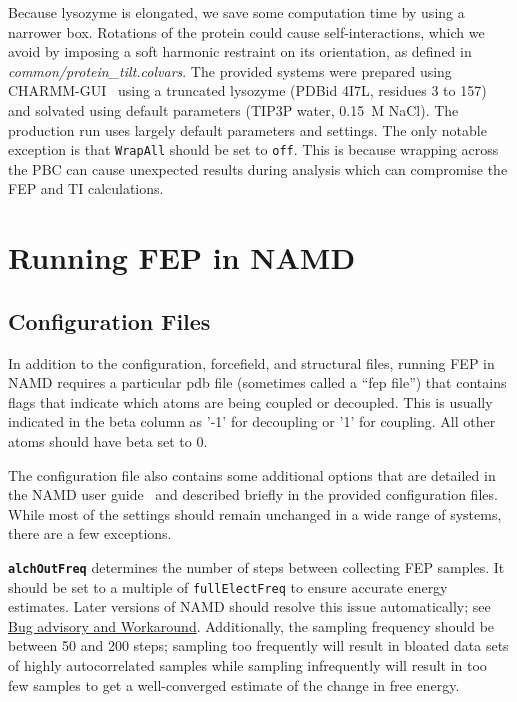 \documentclass[9pt,tutorial]{Styling/livecoms}
\newcommand{\filepath}[1]{\textit{#1}}
\newcommand{\textInput}[1]{\texttt{#1}}
\begin{document}
Because lysozyme is elongated, we save some computation time by using a narrower box. Rotations of the protein could cause self-interactions, which we avoid by imposing a soft harmonic restraint on its orientation, as defined in \filepath{common/protein\_tilt.colvars}. \label{app:equilibration}
The provided systems were prepared using CHARMM-GUI~\cite{Jo2008, Lee2016} using a truncated lysozyme (PDBid 4I7L, residues 3 to 157) and solvated using default parameters (TIP3P water, 0.15~M NaCl). 
The production run uses largely default parameters and settings. The only notable exception is that \textInput{WrapAll} should be set to \textInput{off}. 
This is because wrapping across the PBC can cause unexpected results during analysis which can compromise the FEP and TI calculations.

\section{Running FEP in NAMD}\label{app:FEPparameters}
\subsection{Configuration Files}
In addition to the configuration, forcefield, and structural files, running FEP in NAMD requires a particular pdb file (sometimes called a ``fep file'') that contains flags that indicate which atoms are being coupled or decoupled. This is usually indicated in the beta column as '-1' for decoupling or '1' for coupling. All other atoms should have beta set to 0.

The configuration file also contains some additional options that are detailed in the NAMD user guide~\cite{Bernardi2020} and described briefly in the provided configuration files. While most of the settings should remain unchanged in a wide range of systems, there are a few exceptions.

\textbf{\textInput{alchOutFreq}} determines the number of steps between collecting FEP samples. It should be set to a multiple of \textInput{fullElectFreq} to ensure accurate energy estimates. Later versions of NAMD should resolve this issue automatically; see \href{https://www.ks.uiuc.edu/Research/namd/mailing_list/namd-l.2020-2021/1487.html}{Bug advisory and Workaround}. Additionally, the sampling frequency should be between 50 and 200 steps; sampling too frequently will result in bloated data sets of highly autocorrelated samples while sampling infrequently will result in too few samples to get a well-converged estimate of the change in free energy.
\end{document}

